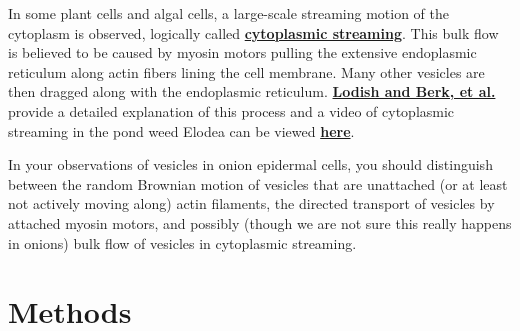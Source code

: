 \documentclass{../lab}
\begin{document}
In some plant cells and algal cells, a large-scale streaming motion of the cytoplasm is observed, logically called \href{http://en.wikipedia.org/wiki/Cytoplasmic\_streaming}{\textbf{cytoplasmic streaming}}. This bulk flow is believed to be caused by myosin motors pulling the extensive endoplasmic reticulum along actin fibers lining the cell membrane. Many other vesicles are then dragged along with the endoplasmic reticulum. \href{http://www.ncbi.nlm.nih.gov/books/bv.fcgi?rid=mcb.figgrp.5242}{\textbf{Lodish and Berk, et al.}} provide a detailed explanation of this process and a video of cytoplasmic streaming in the pond weed Elodea can be viewed \href{http://www.microscopy-uk.org.uk/mag/imgnov00/cycloa3i.avi}{\textbf{here}}.

In your observations of vesicles in onion epidermal cells, you should distinguish between the random Brownian motion of vesicles that are unattached (or at least not actively moving along) actin filaments, the directed transport of vesicles by attached myosin motors, and possibly (though we are not sure this really happens in onions) bulk flow of vesicles in cytoplasmic streaming.

\section{Methods}
\end{document}
